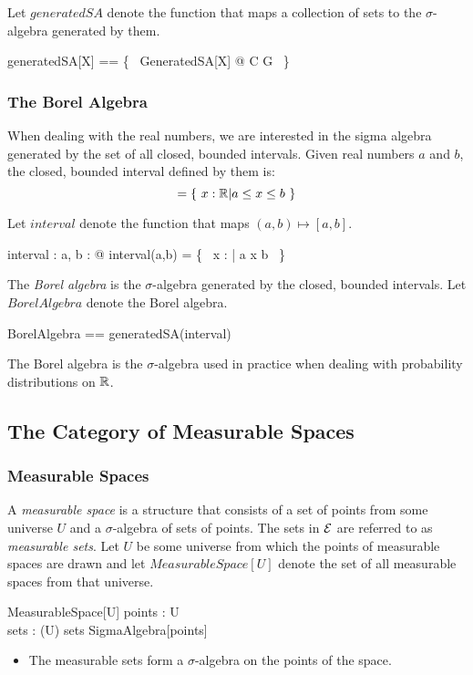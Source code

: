 \documentclass{article}
\begin{document}
Let $generatedSA$ denote the function that maps a collection of sets to the $\sigma$-algebra generated by them.
\begin{zed}
	generatedSA[X] == \{~ GeneratedSA[X] @ C \mapsto G ~\}
\end{zed}

\subsubsection{The Borel Algebra}

When dealing with the real numbers, we are interested in the sigma algebra generated by the set of all closed, bounded intervals. 
Given real numbers $a$ and $b$, the closed, bounded interval defined by them is:
\begin{equation}
	[a,b] = \{~ x : \real | a \leq x \leq b ~\}
\end{equation}

Let $interval$ denote the function that maps $(a,b) \mapsto [a,b]$.
\begin{axdef}
	interval : \real \cross \real \fun \power \real
\where
	\forall a, b : \real @ interval(a,b) = \{~ x : \real | a \realleq x \realleq b ~\}
\end{axdef}

The {\it Borel algebra} is the $\sigma$-algebra generated by the closed, bounded intervals.
Let $BorelAlgebra$ denote the Borel algebra.
\begin{zed}
	BorelAlgebra == generatedSA(\ran interval)
\end{zed}
The Borel algebra is the $\sigma$-algebra used in practice when dealing with probability distributions on $\mathbb{R}$.

\subsection{The Category of Measurable Spaces}

\subsubsection{Measurable Spaces}

A {\it measurable space} is a structure that consists of a set of points from some universe $U$ and 
a $\sigma$-algebra of sets of points.
The sets in ${\cal E}$ are referred to as {\it measurable sets}.
Let $U$ be some universe from which the points of measurable spaces are drawn and let $MeasurableSpace[U]$ denote the set of all measurable spaces from that universe.
\begin{schema}{MeasurableSpace}[U]
	points : \power U \\
	sets : \power (\power U)
\where
	sets \in SigmaAlgebra[points]
\end{schema}
\begin{itemize}
\item The measurable sets form a $\sigma$-algebra on the points of the space.
\end{itemize}
\end{document}

